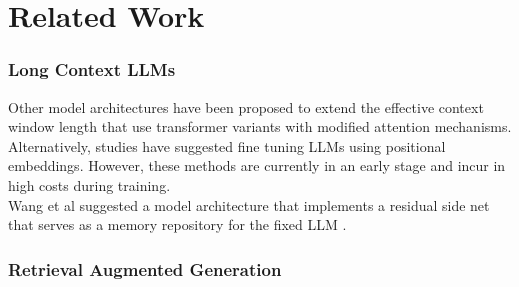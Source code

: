 \cleardoublepage
\chapter{Related Work}
\label{ch:relatedwork}
\label{ch:chapter2}

\subsection{Long Context LLMs}

Other model architectures have been proposed to extend the effective context window length that use transformer variants with modified attention mechanisms. Alternatively, studies have suggested fine tuning LLMs using positional embeddings. However, these methods are currently in an early stage and incur in high costs during training. \\

\noindent Wang et al suggested a model architecture that implements a residual side net that serves as a memory repository for the fixed LLM \cite{wang2023augmentinglanguagemodelslongterm}.

\subsection{Retrieval Augmented Generation}




